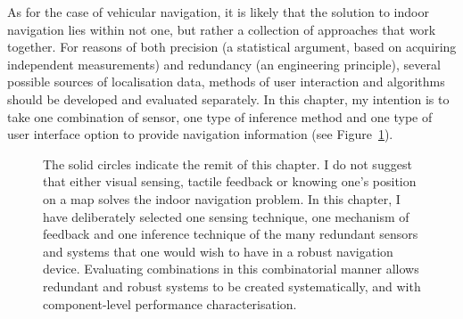 As for the case of vehicular navigation, it is likely that the solution to indoor navigation lies within not one, but rather a collection of approaches that work together.  For reasons of both precision (a statistical argument, based on acquiring independent measurements) and redundancy (an engineering principle), several possible sources of localisation data, methods of user interaction and algorithms should be developed and evaluated separately.  In this chapter, my intention is to take one combination of sensor, one type of inference method and one type of user interface option to provide navigation information (see Figure~\ref{fig:techremit}).

\begin{figure}[]
\centering
{}
\caption{The solid circles indicate the remit of this chapter. I do not suggest that either visual sensing, tactile feedback or knowing one's position on a map solves the indoor navigation problem. In this chapter, I have deliberately selected one sensing technique, one mechanism of feedback and one inference technique of the many redundant sensors and systems that one would wish to have in a robust navigation device. Evaluating combinations in this combinatorial manner allows redundant and robust systems to be created systematically, and with component-level performance characterisation.}
\label{fig:techremit}
\end{figure}




